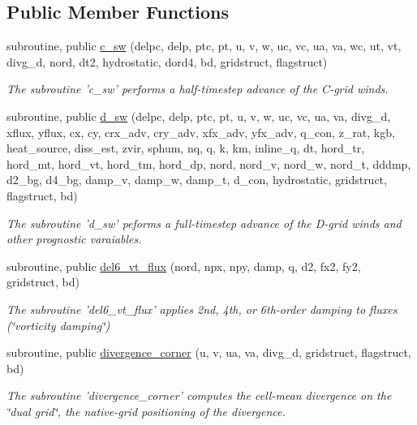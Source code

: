 \subsection*{Public Member Functions}
\begin{DoxyCompactItemize}
\item 
subroutine, public \hyperlink{classsw__core__mod_aea650426b10c000708a33a23a038c7f9}{c\-\_\-sw} (delpc, delp, ptc, pt, u, v, w, uc, vc, ua, va, wc, ut, vt, divg\-\_\-d, nord, dt2, hydrostatic, dord4, bd, gridstruct, flagstruct)
\begin{DoxyCompactList}\small\item\em The subroutine 'c\-\_\-sw' performs a half-\/timestep advance of the C-\/grid winds. \end{DoxyCompactList}\item 
subroutine, public \hyperlink{classsw__core__mod_a3d8c72e37bfa1cf6e6659319c1f8c0d0}{d\-\_\-sw} (delpc, delp, ptc, pt, u, v, w, uc, vc, ua, va, divg\-\_\-d, xflux, yflux, cx, cy, crx\-\_\-adv, cry\-\_\-adv, xfx\-\_\-adv, yfx\-\_\-adv, q\-\_\-con, z\-\_\-rat, kgb, heat\-\_\-source, diss\-\_\-est, zvir, sphum, nq, q, k, km, inline\-\_\-q, dt, hord\-\_\-tr, hord\-\_\-mt, hord\-\_\-vt, hord\-\_\-tm, hord\-\_\-dp, nord, nord\-\_\-v, nord\-\_\-w, nord\-\_\-t, dddmp, d2\-\_\-bg, d4\-\_\-bg, damp\-\_\-v, damp\-\_\-w, damp\-\_\-t, d\-\_\-con, hydrostatic, gridstruct, flagstruct, bd)
\begin{DoxyCompactList}\small\item\em The subroutine 'd\-\_\-sw' peforms a full-\/timestep advance of the D-\/grid winds and other prognostic varaiables. \end{DoxyCompactList}\item 
subroutine, public \hyperlink{classsw__core__mod_ae31bddf8149fa35a7614655b79e7e79a}{del6\-\_\-vt\-\_\-flux} (nord, npx, npy, damp, q, d2, fx2, fy2, gridstruct, bd)
\begin{DoxyCompactList}\small\item\em The subroutine 'del6\-\_\-vt\-\_\-flux' applies 2nd, 4th, or 6th-\/order damping to fluxes (\char`\"{}vorticity damping\char`\"{}) \end{DoxyCompactList}\item 
subroutine, public \hyperlink{classsw__core__mod_ad19f4ba4d0ac8b85bd43f7f8c4b42523}{divergence\-\_\-corner} (u, v, ua, va, divg\-\_\-d, gridstruct, flagstruct, bd)
\begin{DoxyCompactList}\small\item\em The subroutine 'divergence\-\_\-corner' computes the cell-\/mean divergence on the \char`\"{}dual grid\char`\"{}, the native-\/grid positioning of the divergence. \end{DoxyCompactList}\item 

\end{DoxyCompactItemize}
